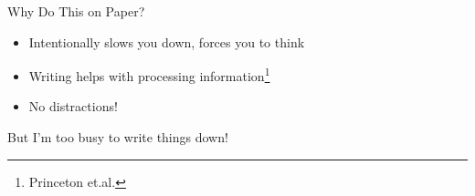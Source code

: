 \documentclass[aspectratio=169]{beamer}
\begin{document}
    {
    \begin{frame}{Why Do This on Paper?}
        \begin{itemize}
            \item Intentionally slows you down, forces you to think
            \item Writing helps with processing information\footnote{Princeton et.al.}
            \pause
            \item No distractions!
        \end{itemize}
    \end{frame}
    }

    {
    \begin{frame}%
        \begin{titlebox}
            \centering
            But I'm too busy to write things down!
        \end{titlebox}
    \end{frame}
    }
\end{document}
